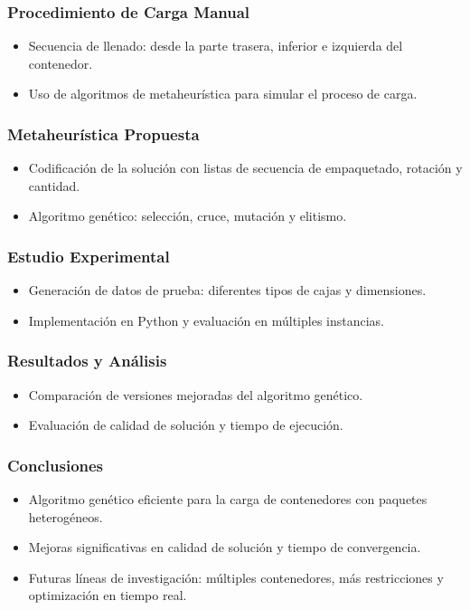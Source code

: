 \documentclass{beamer}
\begin{document}
\begin{frame}
    \frametitle{Procedimiento de Carga Manual}
    \begin{itemize}
        \item Secuencia de llenado: desde la parte trasera, inferior e izquierda del contenedor.
        \item Uso de algoritmos de metaheurística para simular el proceso de carga.
    \end{itemize}
\end{frame}

\begin{frame}
    \frametitle{Metaheurística Propuesta}
    \begin{itemize}
        \item Codificación de la solución con listas de secuencia de empaquetado, rotación y cantidad.
        \item Algoritmo genético: selección, cruce, mutación y elitismo.
    \end{itemize}
\end{frame}

\begin{frame}
    \frametitle{Estudio Experimental}
    \begin{itemize}
        \item Generación de datos de prueba: diferentes tipos de cajas y dimensiones.
        \item Implementación en Python y evaluación en múltiples instancias.
    \end{itemize}
\end{frame}

\begin{frame}
    \frametitle{Resultados y Análisis}
    \begin{itemize}
        \item Comparación de versiones mejoradas del algoritmo genético.
        \item Evaluación de calidad de solución y tiempo de ejecución.
    \end{itemize}
\end{frame}

\begin{frame}
    \frametitle{Conclusiones}
    \begin{itemize}
        \item Algoritmo genético eficiente para la carga de contenedores con paquetes heterogéneos.
        \item Mejoras significativas en calidad de solución y tiempo de convergencia.
        \item Futuras líneas de investigación: múltiples contenedores, más restricciones y optimización en tiempo real.
    \end{itemize}
\end{frame}
\end{document}

